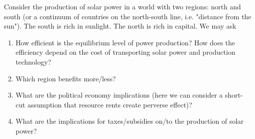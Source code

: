 \documentclass[12pt]{article}%
\begin{document}
\begin{itemize}
Consider the production of solar power in a world with two regions: north and south (or a continuum of countries on the north-south line, i.e. "distance from the sun"). The south is rich in sunlight. The north is rich in capital. We may ask
\begin{enumerate}
    \item  How efficient is the equilibrium level of power production? How does the efficiency depend on the cost of transporting solar power and production technology?
    \item Which region benefits more/less?
    \item What are the political economy implications (here we can consider a short-cut assumption that resource rents create perverse effect)?
    \item What are the implications for taxes/subsidies on/to the production of solar power?
\end{enumerate}
\end{itemize}
\end{document}
